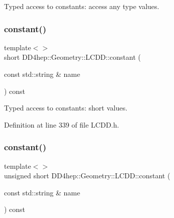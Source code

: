 Typed access to constants\+: access any type values. 

\hypertarget{class_d_d4hep_1_1_geometry_1_1_l_c_d_d_a0c94f67b61a403ef9780b9aed0133f8e}{}\label{class_d_d4hep_1_1_geometry_1_1_l_c_d_d_a0c94f67b61a403ef9780b9aed0133f8e} 
\subsubsection{\texorpdfstring{constant()}{constant()}\hspace{0.1cm}{\footnotesize\ttfamily [3/10]}}
{\footnotesize\ttfamily template$<$$>$ \\
short D\+D4hep\+::\+Geometry\+::\+L\+C\+D\+D\+::constant (\begin{DoxyParamCaption}\item[{const std\+::string \&}]{name }\end{DoxyParamCaption}) const\hspace{0.3cm}{\ttfamily [inline]}}



Typed access to constants\+: short values. 



Definition at line 339 of file L\+C\+D\+D.\+h.

\hypertarget{class_d_d4hep_1_1_geometry_1_1_l_c_d_d_a41c57dabf50cbe671d89f967395eb991}{}\label{class_d_d4hep_1_1_geometry_1_1_l_c_d_d_a41c57dabf50cbe671d89f967395eb991} 
\subsubsection{\texorpdfstring{constant()}{constant()}\hspace{0.1cm}{\footnotesize\ttfamily [4/10]}}
{\footnotesize\ttfamily template$<$$>$ \\
unsigned short D\+D4hep\+::\+Geometry\+::\+L\+C\+D\+D\+::constant (\begin{DoxyParamCaption}\item[{const std\+::string \&}]{name }\end{DoxyParamCaption}) const\hspace{0.3cm}{\ttfamily [inline]}}



